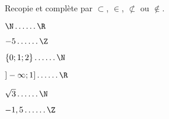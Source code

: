 
Recopie et complète par $\subset$, $\in$, $\not\subset$ ou $\notin$.

\begin{enumerate}
\begin{minipage}{0.32\linewidth}
\item $\N \ldots \ldots \R$
\item $-5 \ldots \ldots \Z$
\end{minipage}
\hfill
\begin{minipage}{0.32\linewidth}
\item $\left\lbrace 0;1;2 \right\rbrace \ldots \ldots \N$
\item $]-\infty;1] \ldots \ldots \R$
\end{minipage}
\hfill
\begin{minipage}{0.32\linewidth}
\item $\sqrt{3} \ldots \ldots \N$
\item $-1,5 \ldots \ldots \Z$
\end{minipage}
\end{enumerate}